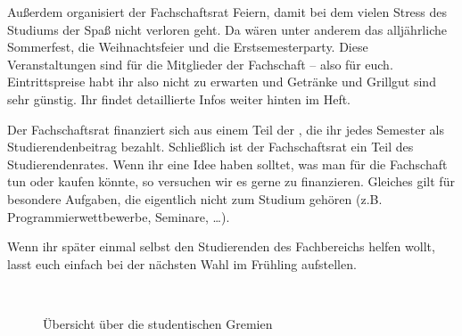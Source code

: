 Außerdem organisiert der Fachschaftsrat Feiern, damit bei dem vielen Stress des Studiums der Spaß nicht verloren geht.
Da wären unter anderem das alljährliche Sommerfest, die Weihnachtsfeier und die Erstsemesterparty.
Diese Veranstaltungen sind für die Mitglieder der Fachschaft -- also für euch.
Eintrittspreise habt ihr also nicht zu erwarten und Getränke und Grillgut sind sehr günstig.
Ihr findet detaillierte Infos weiter hinten im Heft.

Der Fachschaftsrat finanziert sich aus einem Teil der , die ihr jedes Semester als Studierendenbeitrag bezahlt.
Schließlich ist der Fachschaftsrat ein Teil des Studierendenrates.
Wenn ihr eine Idee haben solltet, was man für die Fachschaft tun oder kaufen könnte, so versuchen wir es gerne zu finanzieren.
Gleiches gilt für besondere Aufgaben, die eigentlich nicht zum Studium gehören (\;z.B. Programmierwettbewerbe, Seminare, \ldots).

Wenn ihr später einmal selbst den Studierenden des Fachbereichs helfen wollt, lasst euch einfach bei der nächsten Wahl im Frühling aufstellen.

\\

\begin{figure}[htb]
    \centering
    \caption{Übersicht über die studentischen Gremien}
    \label{fig:gremien}
\end{figure}

